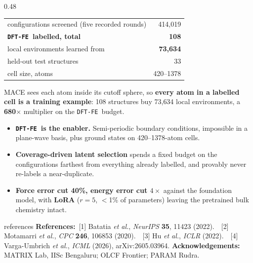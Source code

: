 \documentclass[serif,mathserif,final]{beamer}
\newcommand{\DFTFE}{\texttt{DFT-FE}}
\newcommand{\good}[1]{\textcolor{goodgreen}{\textbf{#1}}}
\newcommand{\key}[1]{\textcolor{inkblue}{\textbf{#1}}}
\begin{document}
\begin{frame}[t]
\begin{columns}[t]
\begin{column}{0.48\paperwidth}
\vspace{0.5em}

\begin{tcolorbox}[posterbox,title=Data efficiency across the campaign]
\justifying
\begin{center}\large
\begin{tabular}{lr}
\toprule
configurations screened (five recorded rounds) & 414{,}019 \\
\textbf{\DFTFE\ labelled, total}               & \key{108} \\
local environments learned from                & \good{73{,}634} \\
held-out test structures                       & 33 \\
cell size, atoms                               & 420--1378 \\
\bottomrule
\end{tabular}
\end{center}
\vspace{0.3em}
MACE sees each atom inside its cutoff sphere, so \textbf{every atom in a
labelled cell is a training example}: 108 structures buy 73{,}634 local
environments, a \good{680$\times$} multiplier on the \DFTFE\ budget.
\end{tcolorbox}

\vspace{0.5em}

\begin{tcolorbox}[posterbox,title=Conclusions,colframe=inkblue]
\justifying
\begin{itemize}
  \item \key{\DFTFE\ is the enabler.} Semi-periodic boundary conditions,
        impossible in a plane-wave basis, plus ground states on
        420--1378-atom cells.
  \item \key{Coverage-driven latent selection} spends a fixed budget on the
        configurations farthest from everything already labelled, and provably
        never re-labels a near-duplicate.
  \item \key{Force error cut 40\%, energy error cut $4\times$} against the
        foundation model, with \key{LoRA} ($r=5$, $<$1\% of parameters)
        leaving the pretrained bulk chemistry intact.
\end{itemize}
\end{tcolorbox}

\vspace{0.5em}

\begin{beamercolorbox}[wd=\linewidth,leftskip=1em]{references}
{\small\textbf{References:}\ [1] Batatia \emph{et al.}, \emph{NeurIPS}
\textbf{35}, 11423 (2022).\ \ [2] Motamarri \emph{et al.}, \emph{CPC}
\textbf{246}, 106853 (2020).\ \ [3] Hu \emph{et al.}, \emph{ICLR} (2022).\ \
[4] Varga-Umbrich \emph{et al.}, \emph{ICML} (2026), arXiv:2605.03964.
\quad\textbf{Acknowledgements:} MATRIX Lab, IISc Bengaluru; OLCF Frontier;
PARAM Rudra.}
\end{beamercolorbox}


\end{column}
\end{columns}
\end{frame}
\end{document}
